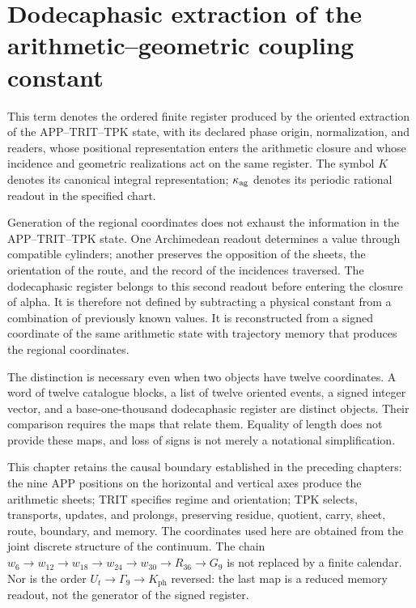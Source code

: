 \section{Dodecaphasic extraction of the arithmetic--geometric coupling constant}
\label{sec:k-registro}

\begin{definition}
\label{lib01:definicion}
This term denotes the ordered finite register produced by the oriented
extraction of the APP--TRIT--TPK state, with its declared phase origin, normalization, and
readers, whose positional representation enters the arithmetic
closure and whose incidence and geometric realizations act
on the same register. The symbol \(K\) denotes its canonical
integral representation; \(\kappa_{\rm ag}\) denotes its periodic
rational readout in the specified chart.
\end{definition}

Generation of the regional coordinates does not exhaust the information in the
APP--TRIT--TPK state. One Archimedean readout determines a value through
compatible cylinders; another preserves the opposition of the sheets, the
orientation of the route, and the record of the incidences traversed. The
dodecaphasic register belongs to this second readout before entering
the closure of alpha. It is therefore not defined by subtracting a physical constant from
a combination of previously known values. It is reconstructed from a
signed coordinate of the same arithmetic state with trajectory memory that produces the regional
coordinates.

The distinction is necessary even when two objects have twelve
coordinates. A word of twelve catalogue blocks, a list of twelve
oriented events, a signed integer vector, and a base-one-thousand dodecaphasic register are
distinct objects. Their comparison requires the maps that
relate them. Equality of length does not provide these maps, and
loss of signs is not merely a notational simplification.

This chapter retains the causal boundary established in the preceding chapters:
the nine APP positions on the horizontal and vertical axes produce the
arithmetic sheets; TRIT specifies regime and orientation; TPK selects,
transports, updates, and prolongs, preserving residue, quotient, carry,
sheet, route, boundary, and memory. The coordinates used here are obtained
from the joint discrete structure of the continuum. The chain
\(w_6\to w_{12}\to w_{18}\to w_{24}\to w_{30}\to R_{36}\to G_9\)
is not replaced by a finite calendar. Nor is the order
\(U_t\to\Gamma_9\to K_{\mathrm{ph}}\) reversed: the last map is a
reduced memory readout, not the generator of the signed register.

